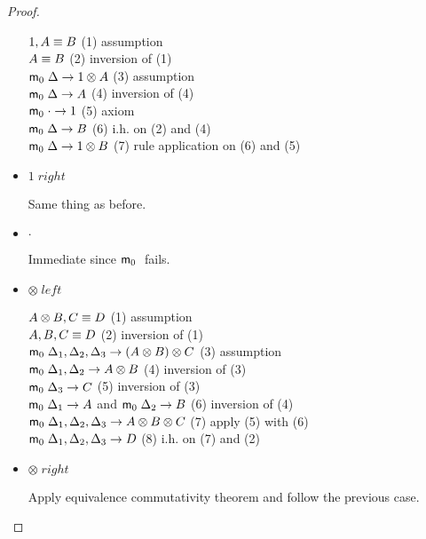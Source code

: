 \begin{proof}
\begin{itemize}
      $1, A \equiv B$ \hfill (1) assumption \\
      $A \equiv B$ \hfill (2) inversion of (1) \\
      $\mathsf{m}_0 \; \Delta \rightarrow 1 \otimes A$ \hfill (3) assumption \\
      $\mathsf{m}_0 \; \Delta \rightarrow A$ \hfill (4) inversion of (4) \\
      $\mathsf{m}_0 \; \cdot \rightarrow 1$ \hfill (5) axiom \\
      $\mathsf{m}_0 \; \Delta \rightarrow B$ \hfill (6) i.h. on (2) and (4) \\
      $\mathsf{m}_0 \; \Delta \rightarrow 1 \otimes B$ \hfill (7) rule application on (6) and (5) \\
      
      \item $1 \; right$
      
      Same thing as before.
      
      \item $\cdot$
      
      Immediate since $\mathsf{m}_0 \;$ fails.
      
      \item $\otimes \; left$
      
      $A \otimes B, C \equiv D$ \hfill (1) assumption \\
      $A, B, C \equiv D$ \hfill (2) inversion of (1) \\
      $\mathsf{m}_0 \; \Delta_1, \Delta_2, \Delta_3 \rightarrow (A \otimes B) \otimes C$ \hfill (3) assumption \\
      $\mathsf{m}_0 \; \Delta_1, \Delta_2 \rightarrow A \otimes B$ \hfill (4) inversion of (3) \\
      $\mathsf{m}_0 \; \Delta_3 \rightarrow C$ \hfill (5) inversion of (3) \\
      $\mathsf{m}_0 \; \Delta_1 \rightarrow A$ and $\mathsf{m}_0 \; \Delta_2 \rightarrow B$ \hfill (6) inversion of (4) \\
      $\mathsf{m}_0 \; \Delta_1, \Delta_2, \Delta_3 \rightarrow A \otimes B \otimes C$ \hfill (7) apply (5) with (6) \\
      $\mathsf{m}_0 \; \Delta_1, \Delta_2, \Delta_3 \rightarrow D$ \hfill (8) i.h. on (7) and (2)\\
      
      \item $\otimes \; right$
      
      Apply equivalence commutativity theorem and follow the previous case.
   \end{itemize}
\end{proof}
